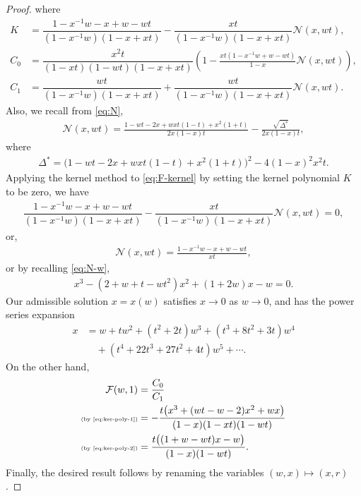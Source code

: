 \documentclass[reqno]{amsart}
\numberwithin{equation}{section}
\theoremstyle{plain}
\theoremstyle{definition}
\theoremstyle{named}
\newcommand{\cN}{\mathcal{N}}
\newcommand{\cF}{\mathcal{F}}
\begin{document}
\begin{proof}
	where
	\begin{align*}
		K&=\dfrac{1-x^{-1}w-x+w-wt}{(1-x^{-1}w)(1-x+xt)}-\dfrac{xt}{(1-x^{-1}w)(1-x+xt)}\cN(x,wt),\\
		C_0&=\dfrac{x^2t}{(1-xt)(1-wt)(1-x+xt)}\left(1-\frac{xt(1-x^{-1}w+w-wt)}{1-x}\cN(x,wt)\right),\\
		C_1&=\dfrac{wt}{(1-x^{-1}w)(1-x+xt)}+\dfrac{wt}{(1-x^{-1}w)(1-x+xt)}\cN(x,wt).
	\end{align*}
	Also, we recall from \eqref{eq:N},
	\begin{align}\label{eq:N-w}
		\cN(x,wt)=\frac{1-wt-2x+wxt(1-t)+x^2(1+t)}{2x(1-x)t}-\frac{\sqrt{\Delta^*}}{2x(1-x)t},
	\end{align}
	where
	\begin{align*}
		\Delta^*=\big(1-wt-2x+wxt(1-t)+x^2(1+t)\big)^2-4(1-x)^2 x^2 t.
	\end{align*}
	Applying the kernel method to \eqref{eq:F-kernel} by setting the kernel polynomial $K$ to be zero, we have
	\begin{align*}
		\dfrac{1-x^{-1}w-x+w-wt}{(1-x^{-1}w)(1-x+xt)}-\dfrac{xt}{(1-x^{-1}w)(1-x+xt)}\cN(x,wt)=0,
	\end{align*}
	or,
	\begin{align}\label{eq:ker-poly-1}
		\cN(x,wt) = \frac{1-x^{-1}w-x+w-wt}{xt},
	\end{align}
	or by recalling \eqref{eq:N-w},
	\begin{align}\label{eq:ker-poly-2}
		x^3-(2+w+t-wt^2)x^2+(1+2w)x-w=0.
	\end{align}
	Our admissible solution $x=x(w)$ satisfies $x\to 0$ as $w\to 0$, and has the power series expansion
	\begin{align*}
		x&=w + t w^2 + (t ^2+2 t) w^3 + (t ^3+8 t ^2+3 t) w^4\\
		&\quad + (t ^4+22 t ^3+27 t ^2+4 t) w^5+\cdots.
	\end{align*}
	On the other hand,
	\begin{align*}
		\cF(w,1)&=\frac{C_0}{C_1}\\
		\text{\tiny (by \eqref{eq:ker-poly-1})}&=-\frac{t \big(x^3+(wt-w-2)x^2+w x\big)}{(1-x)(1-xt)(1-wt)}\\
		\text{\tiny (by \eqref{eq:ker-poly-2})} &= \frac{t\big((1+w-wt) x-w\big)}{(1-x)(1-wt)}.
	\end{align*}
	Finally, the desired result follows by renaming the variables $(w,x)\mapsto (x,r)$.
\end{proof}
\end{document}
